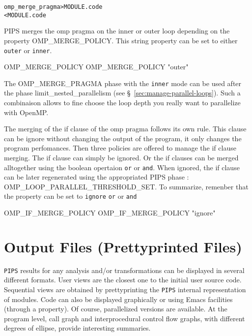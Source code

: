 \documentclass[a4paper]{report}
\newenvironment{PipsMake}{\begin{alltt}}{\end{alltt}}
\newcommand{\Pips}{\texttt{PIPS}}
\begin{document}
\begin{PipsMake}
omp_merge_pragma             > MODULE.code
        < MODULE.code
\end{PipsMake}

PIPS merges the omp pragma on the inner or outer loop depending on the
property OMP\_MERGE\_POLICY. This string property can be set to either
\verb|outer| or \verb|inner|.
\begin{PipsProp}{OMP_MERGE_POLICY}
OMP_MERGE_POLICY "outer"
\end{PipsProp}

The OMP\_MERGE\_PRAGMA phase with the \verb|inner| mode can be used after the
phase limit\_nested\_parallelism (see \S~\ref{sec:manage-parallel-loops}).
Such a combinaison allows to fine choose the loop depth you
really want to parallelize with OpenMP.

The merging of the if clause of the omp pragma follows its own rule.
This clause can be ignore without changing the output of the program,
it only changes the program perfomances.
Then three policies are offered to manage the if clause merging. The if clause
can simply be ignored. Or the if clauses can be merged alltogether using the
boolean opertaion \verb|or| or \verb|and|. When ignored, the if clause can be
later regenerated using the appropriated PIPS phase :
OMP\_LOOP\_PARALLEL\_THRESHOLD\_SET. To summarize, remenber that the property
can be set to \verb|ignore| \verb|or| or \verb|and|
\begin{PipsProp}{OMP_IF_MERGE_POLICY}
OMP_IF_MERGE_POLICY "ignore"
\end{PipsProp}


\chapter{Output Files (Prettyprinted Files)}
\label{section-output-files}

\Pips{} results for any analysis and/or transformations can be
displayed in several different formats. User views are the closest one
to the initial user source code. Sequential views are obtained by
prettyprinting the \Pips{} internal representation of modules. Code
can also be displayed graphically or using Emacs facilities (through a
property). Of course, parallelized versions are available. At the
program level, call graph and interprocedural control flow graphs,
with different degrees of ellipse, provide interesting summaries.
\end{document}
